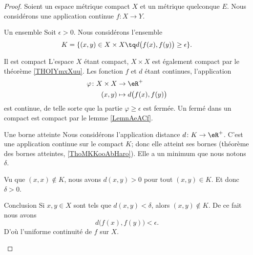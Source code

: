 \begin{proof}
    Soient un espace métrique compact \( X\) et un métrique quelconque \( E\). Nous considérons une application continue \( f\colon X\to Y\).

    \begin{subproof}
        \item[Un ensemble]
            Soit \( \epsilon>0\). Nous considérons l'ensemble
            \begin{equation}
                K=\{ (x,y)\in X\times X\tq d\big( f(x), f(y) \big)\geq \epsilon \}.
            \end{equation}
        \item[Il est compact]
            L'espace \( X\) étant compact, \( X\times X\) est également compact par le théorème \ref{THOIYmxXuu}. Les fonction \( f\) et \( d\) étant continues, l'application
            \begin{equation}
                \begin{aligned}
                    \varphi\colon X\times X&\to \eR^+ \\
                    (x,y)&\mapsto d\big( f(x), f(y) \big) 
                \end{aligned}
            \end{equation}
            est continue, de telle sorte que la partie \( \varphi\geq \epsilon\) est fermée. Un fermé dans un compact est compact par le lemme \ref{LemnAeACf}.
        \item[Une borne atteinte]
            Nous considérons l'application distance \( d\colon K\to \eR^+\). C'est une application continue sur le compact \( K\); donc elle atteint ses bornes (théorème des bornes atteintes, \ref{ThoMKKooAbHaro}). Elle a un minimum que nous notons \( \delta\).

            Vu que \( (x,x)\notin K\), nous avons \( d(x,y)>0\) pour tout \( (x,y)\in K\). Et donc \( \delta>0\).
        \item[Conclusion]
            Si \( x,y\in X\) sont tels que \( d(x,y)<\delta\), alors \( (x,y)\notin K\). De ce fait nous avons
            \begin{equation}
                d\big( f(x), f(y) \big)<\epsilon.
            \end{equation}
            D'où l'uniforme continuité de \( f\) sur \( X\).
    \end{subproof}
\end{proof}

